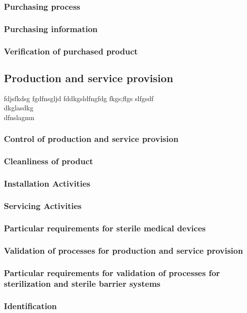 \documentclass{article}
\begin{document}
\subsubsection{Purchasing process}
\subsubsection{Purchasing information}
\subsubsection{Verification of purchased product}
\subsection{Production and service provision}
fdjsfkdsg
fgdfnsgljd
fddkgsldfngfdg
fkgs;flgs
slfgsdf\\
dkglasdkg
\\
dfnslagmn

\subsubsection{Control of production and service provision}
\subsubsection{Cleanliness of product}
\subsubsection{Installation Activities}
\subsubsection{Servicing Activities}
\subsubsection{Particular requirements for sterile medical devices}
\subsubsection{Validation of processes for production and service provision}
\subsubsection{Particular requirements for validation of processes for sterilization and sterile
barrier systems}
\subsubsection{Identification}
\end{document}
